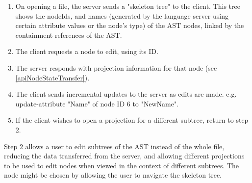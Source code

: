 \documentclass{article}
\begin{document}
\begin{enumerate}
\item On opening a file, the server sends a "skeleton tree" to the client. This tree shows the nodeIds, and names (generated by the language server using certain attribute values or the node's type) of the AST nodes, linked by the containment references of the AST.
\item The client requests a node to edit, using its ID. 
\item The server responds with projection information for that node (see \ref{apiNodeStateTransfer}).
\item The client sends incremental updates to the server as edits are made. e.g. update-attribute "Name" of node ID 6 to "NewName".
\item If the client wishes to open a projection for a different subtree, return to step 2.
\end{enumerate}{
Step 2 allows a user to edit subtrees of the AST instead of the whole file, reducing the data transferred from the server, and allowing different projections to be used to edit nodes when viewed in the context of different subtrees. The node might be chosen by allowing the user to navigate the skeleton tree.

}
\end{document}
